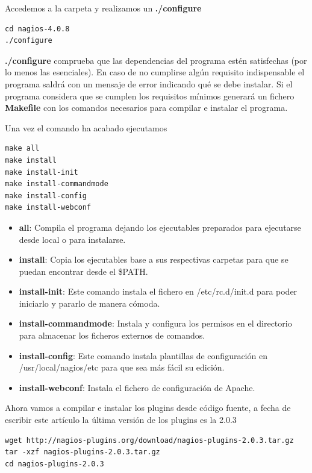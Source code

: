 \documentclass[11pt,a4paper]{article}
\begin{document}
Accedemos a la carpeta y realizamos un \textbf{./configure}

\begin{verbatim}
cd nagios-4.0.8
./configure
\end{verbatim}

\textbf{./configure} comprueba que las dependencias del programa estén satisfechas (por lo menos las esenciales). En caso de no cumplirse algún requisito indispensable el programa saldrá con un mensaje de error indicando qué se debe instalar. Si el programa considera que se cumplen los requisitos mínimos generará un fichero \textbf{Makefile} con los comandos necesarios para compilar e instalar el programa.

Una vez el comando ha acabado ejecutamos

\begin{verbatim}
make all
make install
make install-init
make install-commandmode
make install-config
make install-webconf
\end{verbatim}

\begin{itemize}
\item \textbf{all}: Compila el programa dejando los ejecutables preparados para ejecutarse desde local o para instalarse.
\item \textbf{install}: Copia los ejecutables base a sus respectivas carpetas para que se puedan encontrar desde el \$PATH.
\item \textbf{install-init}: Este comando instala el fichero en /etc/rc.d/init.d para poder iniciarlo y pararlo de manera cómoda.
\item \textbf{install-commandmode}: Instala y configura los permisos en el directorio para almacenar los ficheros externos de comandos.
\item \textbf{install-config}: Este comando instala plantillas de configuración en /usr/local/nagios/etc para que sea más fácil su edición.
\item \textbf{install-webconf}: Instala el fichero de configuración de Apache.
\end{itemize}

Ahora vamos a compilar e instalar los plugins desde código fuente, a fecha de escribir este artículo la última versión de los plugins es la 2.0.3

\begin{verbatim}
wget http://nagios-plugins.org/download/nagios-plugins-2.0.3.tar.gz
tar -xzf nagios-plugins-2.0.3.tar.gz
cd nagios-plugins-2.0.3
\end{verbatim}
\end{document}
